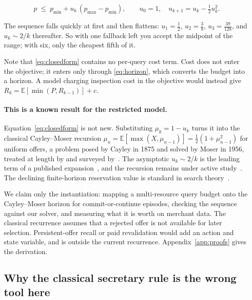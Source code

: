 \begin{equation}
  p \;\le\; p_{\min} + u_k\,(p_{\max} - p_{\min}),
  \qquad u_0 = 1, \quad u_{k+1} = u_k - \tfrac{1}{2}u_k^2 .
  \label{eq:closedform}
\end{equation}

The sequence falls quickly at first and then flattens: $u_1 = \tfrac12$,
$u_2 = \tfrac38$, $u_3 = \tfrac{39}{128}$, and $u_k \sim 2/k$ thereafter. So with
one fallback left you accept the midpoint of the range; with six, only the cheapest
fifth of it.

Note that \eqref{eq:closedform} contains no per-query cost term. Cost does not enter
the objective; it enters only through \eqref{eq:horizon}, which converts the budget
into a horizon. A model charging inspection cost in the objective would instead give
$R_k = \mathbb{E}[\min(P, R_{k-1})] + c$.

\paragraph{This is a known result for the restricted model.}
Equation~\eqref{eq:closedform} is not new. Substituting $\mu_k = 1 - u_k$ turns it
into the classical Cayley--Moser recursion
$\mu_n = \mathbb{E}[\max(X, \mu_{n-1})] = \tfrac12(1 + \mu_{n-1}^2)$ for uniform
offers, a problem posed by Cayley in 1875 and solved by Moser in 1956, treated at
length by \citet{gilbert1966recognizing} and surveyed
by~\citet{ferguson1989secretary}. The asymptotic $u_k \sim 2/k$ is the leading term
of a published expansion~\citep{finch2024quadratic,entwistle2022asymptotics}, and the
recursion remains under active study~\citep{katriel2025cayley}. The declining
finite-horizon reservation value is standard in search
theory~\citep{kohn1974theory,lippman1976job}.

We claim only the instantiation: mapping a multi-resource query budget onto the
Cayley--Moser horizon for commit-or-continue episodes, checking the sequence against
our solver, and measuring what it is worth on merchant data. The classical recurrence
assumes that a rejected offer is not available for later selection. Persistent-offer
recall or paid revalidation would add an action and state variable, and is outside the
current recurrence. Appendix~\ref{app:proofs} gives the derivation.

\subsection{Why the classical secretary rule is the wrong tool here}


